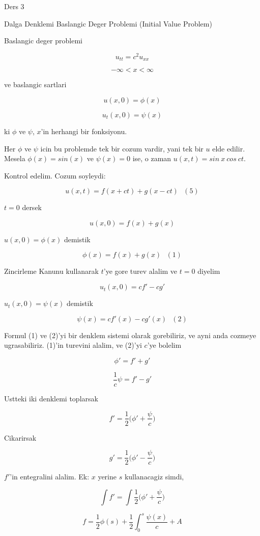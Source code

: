 \documentclass[12pt,fleqn]{article}
\begin{document}
Ders 3

Dalga Denklemi Baslangic Deger Problemi (Initial Value Problem) 

Baslangic deger problemi 

\[ u_{tt} = c^2u_{xx} \]

\[ -\infty < x < \infty \]

ve baslangic sartlari 

\[ u(x,0) = \phi(x) \]

\[ u_t(x,0) = \psi(x) \]

ki $\phi$ ve $\psi$, $x$'in herhangi bir fonksiyonu. 

Her $\phi$ ve $\psi$ icin bu problemde tek bir cozum vardir, yani tek bir
$u$ elde edilir. Mesela $\phi(x) = sin(x)$ ve $\psi(x) = 0$ ise, o zaman
$u(x,t) = sin \ x \ cos \ ct$. 

Kontrol edelim. Cozum soyleydi:

\[ u(x,t) = f(x+ct) + g(x-ct) \ \ \ (5)\]

$t=0$ dersek 

\[ u(x,0)  = f(x) + g(x) \]

$u(x,0) = \phi(x)$ demistik

\[ \phi(x) = f(x) + g(x) \ \ \ (1) \]

Zincirleme Kanunu kullanarak $t$'ye gore turev alalim ve $t=0$ diyelim

\[ u_t(x,0) = cf' - cg' \]

$u_t(x,0) = \psi(x)$ demistik

\[ \psi(x) = cf'(x) - cg'(x) \ \ \ (2) \]

Formul (1) ve (2)'yi bir denklem sistemi olarak gorebiliriz, ve ayni anda
cozmeye ugrasabiliriz. (1)'in turevini alalim, ve (2)'yi $c$'ye bolelim

\[ \phi' = f' + g' \]

\[ \frac{1}{c}\psi = f' - g' \]

Ustteki iki denklemi toplarsak

\[ f' = \frac{1}{2} \bigg( \phi' + \frac{\psi}{c}  \bigg) \]

Cikarirsak

\[ g' = \frac{1}{2}  \bigg( \phi' - \frac{\psi}{c}  \bigg) \]


$f'$'in entegralini alalim. Ek: $x$ yerine $s$ kullanacagiz simdi,

\[ \int f' = \int \frac{1}{2} \bigg( \phi' + \frac{\psi}{c}  \bigg) \]

\[ f = \frac{1}{2}\phi(s) + \frac{1}{2}\int_0^s \frac{\psi(x)}{c} + A\]
\end{document}
